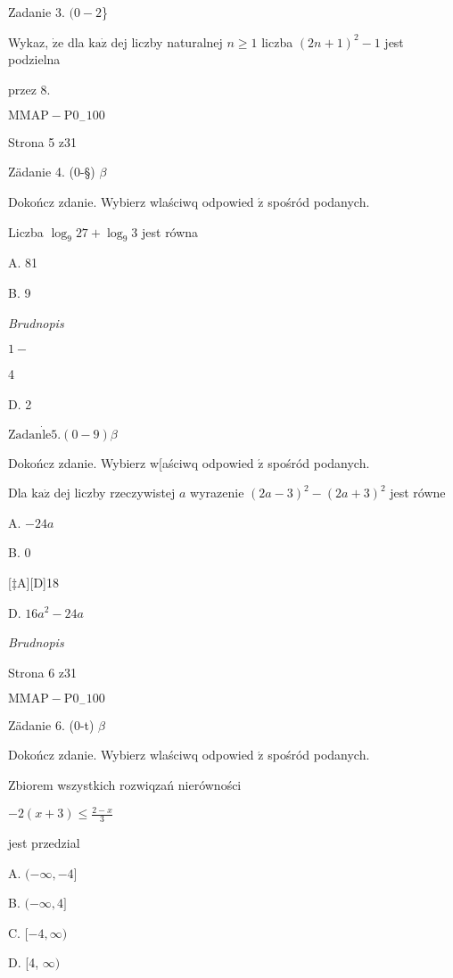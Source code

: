 \documentclass[a4paper,12pt]{article}
\begin{document}
Zadanie 3. $(0-2$\}

Wykaz, $\dot{\mathrm{z}}\mathrm{e}$ dla $\mathrm{k}\mathrm{a}\dot{\mathrm{z}}$ dej liczby naturalnej $n\geq 1$ liczba $(2n+1)^{2}-1$ jest podzielna

przez 8.

$\mathrm{M}\mathrm{M}\mathrm{A}\mathrm{P}-\mathrm{P}0_{-}100$

Strona 5 z31





Zädanie 4. (0-\S) $\beta$

Dokończ zdanie. Wybierz wlaściwq odpowied $\acute{\mathrm{z}}$ spośród podanych.

Liczba $\log_{9}27+\log_{9}3$ jest równa

A. 81

B. 9

{\it Brudnopis}

$1-$

4

D. 2

$\mathrm{Z}\mathrm{a}\mathrm{d}\mathrm{a}\mathrm{n}\dot{\mathrm{l}}\mathrm{e}5. (0-9) \beta$

Dokończ zdanie. Wybierz w[aściwq odpowied $\acute{\mathrm{z}}$ spośród podanych.

Dla $\mathrm{k}\mathrm{a}\dot{\mathrm{z}}$ dej liczby rzeczywistej $a$ wyrazenie $(2a-3)^{2}-(2a+3)^{2}$ jest równe

A. $-24a$

B. 0

[‡A][D]18

D. $16a^{2}-24a$

{\it Brudnopis}

Strona 6 z31

$\mathrm{M}\mathrm{M}\mathrm{A}\mathrm{P}-\mathrm{P}0_{-}100$





Zädanie 6. (0-t) $\beta$

Dokończ zdanie. Wybierz wlaściwq odpowied $\acute{\mathrm{z}}$ spośród podanych.

Zbiorem wszystkich rozwiqzań nierówności

$-2(x+3)\displaystyle \leq\frac{2-x}{3}$

jest przedzial

A. $(-\infty,-4]$

B. $(-\infty,4]$

C. $[-4,\infty)$

D. [4, $\infty)$
\end{document}
